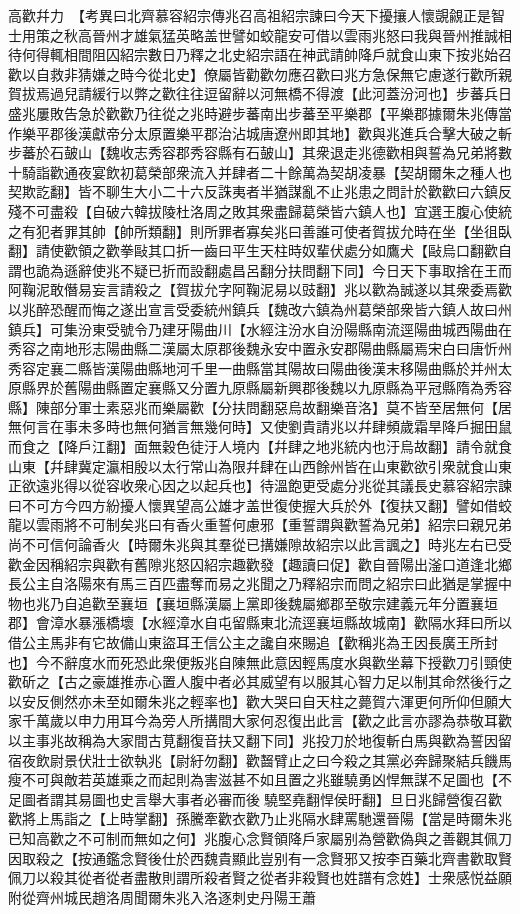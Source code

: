 高歡幷力　【考異曰北齊慕容紹宗傳兆召高祖紹宗諫曰今天下擾攘人懷覬覦正是智士用策之秋高晉州才雄氣猛英略盖世譬如蛟龍安可借以雲雨兆怒曰我與晉州推誠相待何得輒相間阻囚紹宗數日乃釋之北史紹宗語在神武請帥降戶就食山東下按兆始召歡以自救非猜嫌之時今從北史】僚屬皆勸歡勿應召歡曰兆方急保無它慮遂行歡所親賀拔焉過兒請緩行以弊之歡往往逗留辭以河無橋不得渡【此河蓋汾河也】步蕃兵日盛兆屢敗告急於歡歡乃往從之兆時避步蕃南出步蕃至平樂郡【平樂郡據爾朱兆傳當作樂平郡後漢獻帝分太原置樂平郡治沾城唐遼州即其地】歡與兆進兵合擊大破之斬步蕃於石皷山【魏收志秀容郡秀容縣有石皷山】其衆退走兆德歡相與誓為兄弟將數十騎詣歡通夜宴飲初葛榮部衆流入并肆者二十餘萬為契胡凌暴【契胡爾朱之種人也契欺訖翻】皆不聊生大小二十六反誅夷者半猶謀亂不止兆患之問計於歡歡曰六鎮反殘不可盡殺【自破六韓拔陵杜洛周之敗其衆盡歸葛榮皆六鎮人也】宜選王腹心使統之有犯者罪其帥【帥所類翻】則所罪者寡矣兆曰善誰可使者賀拔允時在坐【坐徂臥翻】請使歡領之歡拳敺其口折一齒曰平生天柱時奴輩伏處分如鷹犬【敺烏口翻歡自謂也詭為遜辭使兆不疑已折而設翻處昌呂翻分扶問翻下同】今日天下事取捨在王而阿鞠泥敢僭易妄言請殺之【賀拔允字阿鞠泥易以豉翻】兆以歡為誠遂以其衆委焉歡以兆醉恐醒而悔之遂出宣言受委統州鎮兵【魏改六鎮為州葛榮部衆皆六鎮人故曰州鎮兵】可集汾東受號令乃建牙陽曲川【水經注汾水自汾陽縣南流逕陽曲城西陽曲在秀容之南地形志陽曲縣二漢屬太原郡後魏永安中置永安郡陽曲縣屬焉宋白曰唐忻州秀容定襄二縣皆漢陽曲縣地河千里一曲縣當其陽故曰陽曲後漢末移陽曲縣於并州太原縣界於舊陽曲縣置定襄縣又分置九原縣屬新興郡後魏以九原縣為平冠縣隋為秀容縣】陳部分軍士素惡兆而樂屬歡【分扶問翻惡烏故翻樂音洛】莫不皆至居無何【居無何言在事未多時也無何猶言無幾何時】又使劉貴請兆以幷肆頻歲霜旱降戶掘田鼠而食之【降戶江翻】面無穀色徒汙人境内【幷肆之地兆統内也汙烏故翻】請令就食山東【幷肆冀定瀛相殷以太行常山為限幷肆在山西餘州皆在山東歡欲引衆就食山東正欲遠兆得以從容收衆心因之以起兵也】待溫飽更受處分兆從其議長史慕容紹宗諫曰不可方今四方紛擾人懷異望高公雄才盖世復使握大兵於外【復扶又翻】譬如借蛟龍以雲雨將不可制矣兆曰有香火重誓何慮邪【重誓謂與歡誓為兄弟】紹宗曰親兄弟尚不可信何論香火【時爾朱兆與其羣從已搆嫌隙故紹宗以此言諷之】時兆左右已受歡金因稱紹宗與歡有舊隙兆怒囚紹宗趣歡發【趣讀曰促】歡自晉陽出滏口道逢北鄉長公主自洛陽來有馬三百匹盡奪而易之兆聞之乃釋紹宗而問之紹宗曰此猶是掌握中物也兆乃自追歡至襄垣【襄垣縣漢屬上黨即後魏屬鄉郡至敬宗建義元年分置襄垣郡】會漳水暴漲橋壞【水經漳水自屯留縣東北流逕襄垣縣故城南】歡隔水拜曰所以借公主馬非有它故備山東盜耳王信公主之讒自來賜追【歡稱兆為王因長廣王所封也】今不辭度水而死恐此衆便叛兆自陳無此意因輕馬度水與歡坐幕下授歡刀引頸使歡斫之【古之豪雄推赤心置人腹中者必其威望有以服其心智力足以制其命然後行之以安反側然亦未至如爾朱兆之輕率也】歡大哭曰自天柱之薨賀六渾更何所仰但願大家千萬歲以申力用耳今為旁人所搆間大家何忍復出此言【歡之此言亦謬為恭敬耳歡以主事兆故稱為大家間古莧翻復音扶又翻下同】兆投刀於地復斬白馬與歡為誓因留宿夜飲尉景伏壯士欲執兆【尉紆勿翻】歡齧臂止之曰今殺之其黨必奔歸聚結兵饑馬瘦不可與敵若英雄乘之而起則為害滋甚不如且置之兆雖驍勇凶悍無謀不足圖也【不足圖者謂其易圖也史言舉大事者必審而後驍堅堯翻悍侯旴翻】旦日兆歸營復召歡歡將上馬詣之【上時掌翻】孫騰牽歡衣歡乃止兆隔水肆罵馳還晉陽【當是時爾朱兆已知高歡之不可制而無如之何】兆腹心念賢領降戶家屬别為營歡偽與之善觀其佩刀因取殺之【按通鑑念賢後仕於西魏貴顯此豈别有一念賢邪又按李百藥北齊書歡取賢佩刀以殺其從者從者盡散則謂所殺者賢之從者非殺賢也姓譜有念姓】士衆感悦益願附從齊州城民趙洛周聞爾朱兆入洛逐刺史丹陽王蕭

